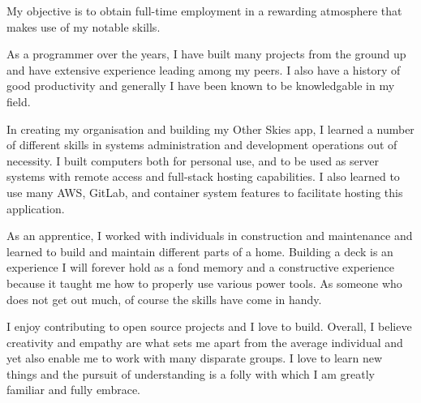 
\begin{cvparagraph}
   My objective is to obtain full-time employment in a rewarding atmosphere that makes use of my
   notable skills.

   As a programmer over the years, I have built many projects from the ground up and have extensive
   experience leading among my peers. I also have a history of good productivity and generally I have
   been known to be knowledgable in my field.

   In creating my organisation and building my Other Skies app, I learned a number of different skills
   in systems administration and development operations out of necessity. I built computers both for
   personal use, and to be used as server systems with remote access and full-stack hosting capabilities.
   I also learned to use many AWS, GitLab, and container system features to facilitate hosting this
   application.

   As an apprentice, I worked with individuals in construction and maintenance and learned to build
   and maintain different parts of a home. Building a deck is an experience I will forever hold as
   a fond memory and a constructive experience because it taught me how to properly use various power
   tools. As someone who does not get out much, of course the skills have come in handy.

   I enjoy contributing to open source projects and I love to build. Overall, I believe creativity
   and empathy are what sets me apart from the average individual and yet also enable me to work
   with many disparate groups. I love to learn new things and the pursuit of understanding is a folly
   with which I am greatly familiar and fully embrace.
\end{cvparagraph}
